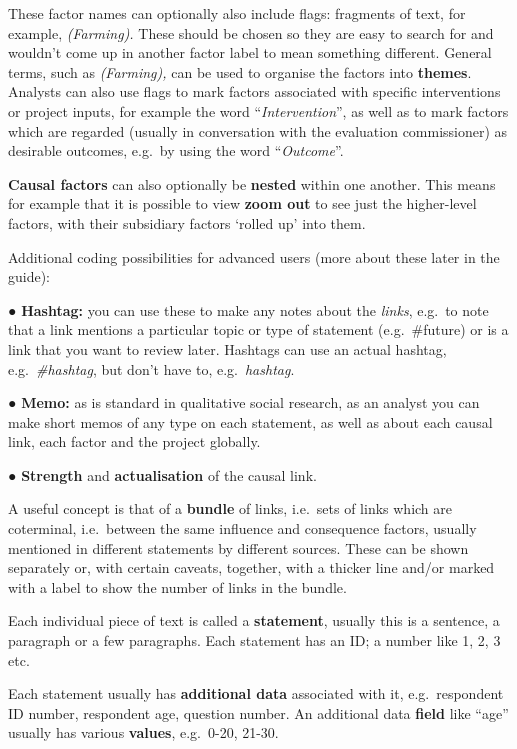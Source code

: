 \documentclass[
]{book}
\begin{document}
These factor names can optionally also include flags: fragments of text, for example, \emph{(Farming).} These should be chosen so they are easy to search for and wouldn't come up in another factor label to mean something different. General terms, such as \emph{(Farming),} can be used to organise the factors into \textbf{themes}. Analysts can also use flags to mark factors associated with specific interventions or project inputs, for example the word ``\emph{Intervention}'', as well as to mark factors which are regarded (usually in conversation with the evaluation commissioner) as desirable outcomes, e.g.~by using the word ``\emph{Outcome}''.

\textbf{Causal factors} can also optionally be \textbf{nested} within one another. This means for example that it is possible to view \textbf{zoom out} to see just the higher-level factors, with their subsidiary factors `rolled up' into them.

Additional coding possibilities for advanced users (more about these later in the guide):

● \textbf{Hashtag:} you can use these to make any notes about the \emph{links}, e.g.~to note that a link mentions a particular topic or type of statement (e.g.~\#future) or is a link that you want to review later. Hashtags can use an actual hashtag, e.g.~\emph{\#hashtag}, but don't have to, e.g.~\emph{hashtag}.

● \textbf{Memo:} as is standard in qualitative social research, as an analyst you can make short memos of any type on each statement, as well as about each causal link, each factor and the project globally.

● \textbf{Strength} and \textbf{actualisation} of the causal link.

A useful concept is that of a \textbf{bundle} of links, i.e.~sets of links which are coterminal, i.e.~between the same influence and consequence factors, usually mentioned in different statements by different sources. These can be shown separately or, with certain caveats, together, with a thicker line and/or marked with a label to show the number of links in the bundle.

Each individual piece of text is called a \textbf{statement}, usually this is a sentence, a paragraph or a few paragraphs. Each statement has an ID; a number like 1, 2, 3 etc.

Each statement usually has \textbf{additional data} associated with it, e.g.~respondent ID number, respondent age, question number. An additional data \textbf{field} like ``age'' usually has various \textbf{values}, e.g.~0-20, 21-30.
\end{document}
